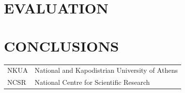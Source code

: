 \documentclass[ack,preface]{dithesis}
\begin{document}
\chapter{EVALUATION}

\chapter{CONCLUSIONS}

\backmatter

\abbreviations
\begin{center}
	\renewcommand{\arraystretch}{1.5}
	\begin{longtable}{ l @{\qquad} l }
	\toprule
	NKUA    & National and Kapodistrian University of Athens\\
	NCSR & National Centre for Scientific Research \\
	\bottomrule
	\end{longtable}
\end{center}







\end{document}
